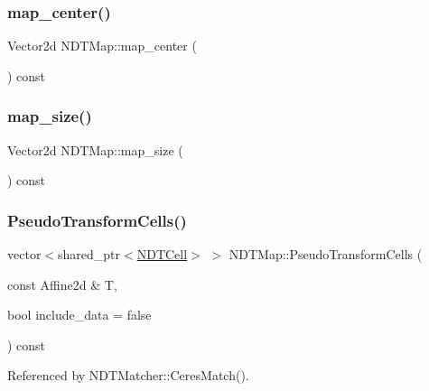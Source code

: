 \subsubsection{\texorpdfstring{map\+\_\+center()}{map\_center()}}
{\footnotesize\ttfamily Vector2d N\+D\+T\+Map\+::map\+\_\+center (\begin{DoxyParamCaption}{ }\end{DoxyParamCaption}) const\hspace{0.3cm}{\ttfamily [inline]}}

\mbox{\label{classNDTMap_aa737ee61fd3b732c7d0fe3cdae4b42d2}} 
\subsubsection{\texorpdfstring{map\+\_\+size()}{map\_size()}}
{\footnotesize\ttfamily Vector2d N\+D\+T\+Map\+::map\+\_\+size (\begin{DoxyParamCaption}{ }\end{DoxyParamCaption}) const\hspace{0.3cm}{\ttfamily [inline]}}

\mbox{\label{classNDTMap_a9203c659af7f7da483d4533885a332f8}} 
\subsubsection{\texorpdfstring{Pseudo\+Transform\+Cells()}{PseudoTransformCells()}\hspace{0.1cm}{\footnotesize\ttfamily [1/2]}}
{\footnotesize\ttfamily vector$<$shared\+\_\+ptr$<$\hyperlink{classNDTCell}{N\+D\+T\+Cell}$>$ $>$ N\+D\+T\+Map\+::\+Pseudo\+Transform\+Cells (\begin{DoxyParamCaption}\item[{const Affine2d \&}]{T,  }\item[{bool}]{include\+\_\+data = {\ttfamily false} }\end{DoxyParamCaption}) const\hspace{0.3cm}{\ttfamily [inline]}}



Referenced by N\+D\+T\+Matcher\+::\+Ceres\+Match().

